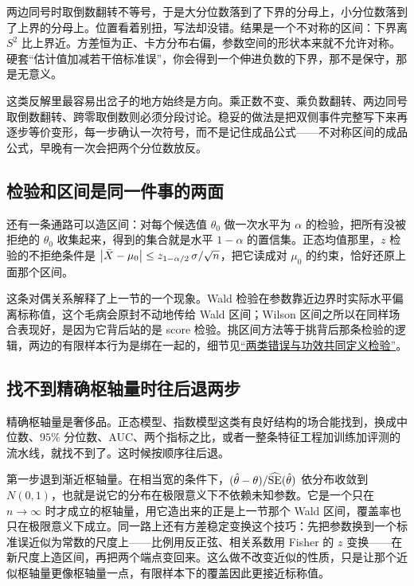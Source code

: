 两边同号时取倒数翻转不等号，于是大分位数落到了下界的分母上，小分位数落到了上界的分母上。位置看着别扭，写法却没错。结果是一个不对称的区间：下界离 \(S^2\) 比上界近。方差恒为正、卡方分布右偏，参数空间的形状本来就不允许对称。硬套``估计值加减若干倍标准误''，你会得到一个伸进负数的下界，那不是保守，那是无意义。

这类反解里最容易出岔子的地方始终是方向。乘正数不变、乘负数翻转、两边同号取倒数翻转、跨零取倒数则必须分段讨论。稳妥的做法是把双侧事件完整写下来再逐步等价变形，每一步确认一次符号，而不是记住成品公式——不对称区间的成品公式，早晚有一次会把两个分位数放反。

\subsection{检验和区间是同一件事的两面}

还有一条通路可以造区间：对每个候选值 \(\theta_0\) 做一次水平为 \(\alpha\) 的检验，把所有没被拒绝的 \(\theta_0\) 收集起来，得到的集合就是水平 \(1-\alpha\) 的置信集。正态均值那里，\(z\) 检验的不拒绝条件是 \(\left|\bar X-\mu_0\right|\le z_{1-\alpha/2}\,\sigma/\sqrt n\)，把它读成对 \(\mu_0\) 的约束，恰好还原上面那个区间。

这条对偶关系解释了上一节的一个现象。Wald 检验在参数靠近边界时实际水平偏离标称值，这个毛病会原封不动地传给 Wald 区间；Wilson 区间之所以在同样场合表现好，是因为它背后站的是 score 检验。挑区间方法等于挑背后那条检验的逻辑，两边的有限样本行为是绑在一起的，细节见\hyperref[sec:11-Mathematical-Statistics/05-Hypothesis-Testing/01]{``两类错误与功效共同定义检验''}。

\subsection{找不到精确枢轴量时往后退两步}

精确枢轴量是奢侈品。正态模型、指数模型这类有良好结构的场合能找到，换成中位数、\(95\%\) 分位数、AUC、两个指标之比，或者一整条特征工程加训练加评测的流水线，就找不到了。这时候按顺序往后退。

第一步退到渐近枢轴量。在相当宽的条件下，\((\hat\theta-\theta)/\widehat{\operatorname{SE}}(\hat\theta)\) 依分布收敛到 \(N(0,1)\)，也就是说它的分布在极限意义下不依赖未知参数。它是一个只在 \(n\to\infty\) 时才成立的枢轴量，用它造出来的正是上一节那个 Wald 区间，覆盖率也只在极限意义下成立。同一路上还有方差稳定变换这个技巧：先把参数换到一个标准误近似为常数的尺度上——比例用反正弦、相关系数用 Fisher 的 \(z\) 变换——在新尺度上造区间，再把两个端点变回来。这么做不改变近似的性质，只是让那个近似枢轴量更像枢轴量一点，有限样本下的覆盖因此更接近标称值。

